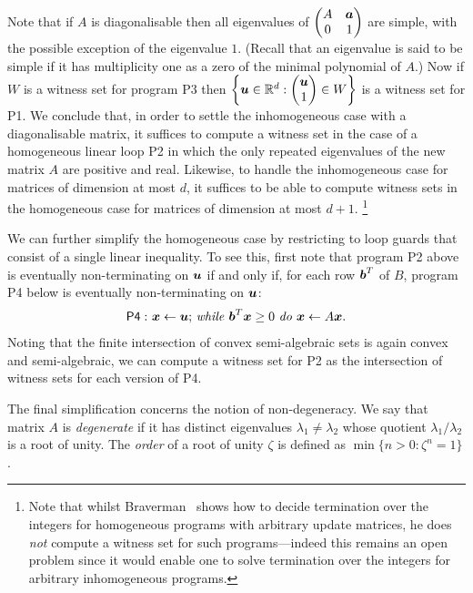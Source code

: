 Note that if $A$ is diagonalisable then all
eigenvalues of
$\begin{pmatrix}A&\boldsymbol{a}\\ 0 & 1
\end{pmatrix}$ are simple, with the possible exception of the
eigenvalue $1$.  (Recall that an eigenvalue is said to be simple if it
has multiplicity one as a zero of the minimal polynomial of $A$.)  Now
if $W$ is a witness set for program \textsf{P3} then $\left\lbrace
  \boldsymbol{u} \in \mathbb{R}^{d} : \begin{pmatrix} \boldsymbol{u}\\
    1\end{pmatrix} \in W \right\rbrace$ is a witness set for \textsf{P1}.
We conclude that, in order to settle the inhomogeneous case with a
diagonalisable matrix, it suffices to compute a witness set in the
case of a homogeneous linear loop \textsf{P2} in which the only
repeated eigenvalues of the new matrix $A$ are positive and real.
Likewise, to handle the inhomogeneous case for matrices of dimension
at most $d$, it suffices to be able to compute witness sets in the
homogeneous case for matrices of dimension at most $d+1$.%
\footnote{Note that whilst Braverman~\cite{Bra06} shows how to decide
  termination over the integers for homogeneous programs with
  arbitrary update matrices, he does \emph{not} compute a witness set
  for such programs---indeed this remains an open problem since it
  would enable one to solve termination over the integers for
  arbitrary inhomogeneous programs.}

We can further simplify the homogeneous case by restricting to loop
guards that consist of a single linear inequality.  To see this, first
note that program \textsf{P2} above is eventually non-terminating on
$\boldsymbol{u}$ if and only if, for each row $\boldsymbol{b}^T$ of $B$,
program \textsf{P4} below is eventually non-terminating on
$\boldsymbol{u}$:
\begin{gather*}
\mathsf{P4:}\ \mbox{$\boldsymbol{x}\gets \boldsymbol{u}$;
\textit{while} $\boldsymbol{b}^T\boldsymbol{x} \geq 0$ \textit{do} $\boldsymbol{x}\leftarrow A\boldsymbol{x}$.}
\end{gather*}
Noting that the finite intersection of convex semi-algebraic sets is
again convex and semi-algebraic, we can compute a witness set
for \textsf{P2} as the intersection of witness sets for each version
of \textsf{P4}.

The final simplification concerns the notion of
non-degeneracy.  We say that matrix $A$ is \emph{degenerate} if it has
distinct eigenvalues $\lambda_1 \neq \lambda_2$ whose quotient
$\lambda_1/\lambda_2$ is a root of unity.
The \emph{order} of a root of unity $\zeta$ is defined as
$\min\lbrace n > 0 : \zeta^{n} = 1 \rbrace$.

